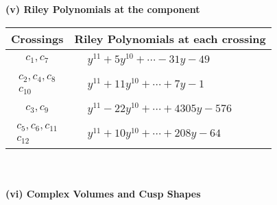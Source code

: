\documentclass[1p]{elsarticle_modified}
\theoremstyle{definition}
\begin{document}
\newpage\renewcommand{\arraystretch}{1}
\flushleft \textbf{(v) Riley Polynomials at the component}\newline \\
\begin{tabular}{m{50pt}|m{274pt}}
Crossings & \hspace{64pt}Riley Polynomials at each crossing \\
\hline $$\begin{aligned}c_{1},c_{7}\end{aligned}$$&$\begin{aligned}
&y^{11}+5 y^{10}+\cdots-31 y-49
\end{aligned}$\\
\hline $$\begin{aligned}c_{2},c_{4},c_{8}\\c_{10}\end{aligned}$$&$\begin{aligned}
&y^{11}+11 y^{10}+\cdots+7 y-1
\end{aligned}$\\
\hline $$\begin{aligned}c_{3},c_{9}\end{aligned}$$&$\begin{aligned}
&y^{11}-22 y^{10}+\cdots+4305 y-576
\end{aligned}$\\
\hline $$\begin{aligned}c_{5},c_{6},c_{11}\\c_{12}\end{aligned}$$&$\begin{aligned}
&y^{11}+10 y^{10}+\cdots+208 y-64
\end{aligned}$\\
\hline
\end{tabular}\\~\\
\newpage\flushleft \textbf{(vi) Complex Volumes and Cusp Shapes}
\end{document}
